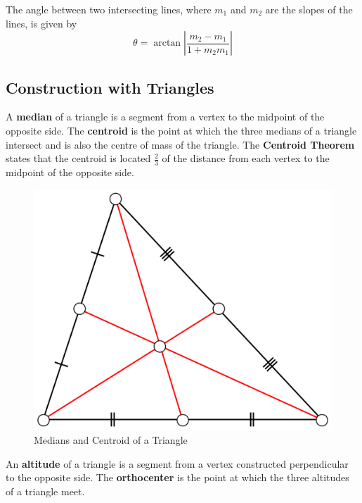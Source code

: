         \noindent The angle between two intersecting lines, where $m_1$ and $m_2$ are the slopes
        of the lines, is given by \\

        \begin{equation*}
            \theta = \arctan{\left|\frac{m_2-m_1}{1+m_2m_1}\right|}
        \end{equation*}



    \subsection{Construction with Triangles}
        A \textbf{median} of a triangle is a segment from a vertex to the midpoint of the opposite
        side. The \textbf{centroid} is the point at which the three medians of a triangle intersect
        and is also the centre of mass of the triangle. The \color{purple} \textbf{Centroid Theorem}
        \color{black} states that the centroid is located $\frac{2}{3}$ of the distance from each
        vertex to the midpoint of the opposite side. \\

        \begin{figure} [hbt!]
            \centering
            \includegraphics[scale = 0.075] {Resources/Unit2Triangles/centroid.PNG}
            \caption*{Medians and Centroid of a Triangle}
        \end{figure}

        \noindent An \textbf{altitude} of a triangle is a segment from a vertex constructed
        perpendicular to the opposite side. The \textbf{orthocenter} is the point at which the
        three altitudes of a triangle meet.

